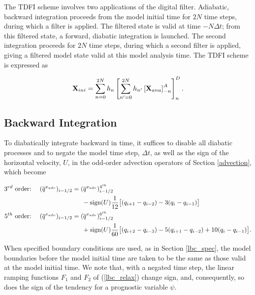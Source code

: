The TDFI scheme involves two applications of the digital filter. Adiabatic, 
backward integration proceeds from the model initial time for $2N$ time steps, 
during which a filter is applied. The filtered state is valid at time $-N \Delta t$; 
from this filtered state, a forward, diabatic integration is launched. The 
second integration proceeds for $2N$ time steps, during which a second filter 
is applied, giving a filtered model state valid at this model analysis time. 
The TDFI scheme is expressed as

\begin{equation}
{\bf X}_{ini} = \sum_{n=0}^{2N} h_n \left[    \sum_{n'=0}^{2N} h_{n'} \left[ {\bf X}_{ana} \right]_{-n}^A \right]_n^D.
\end{equation}

\subsection{Backward Integration}

To diabatically integrate backward in time, it suffices to disable all 
diabatic processes and to negate the model time step, $\Delta t$, as well as 
the sign of the horizontal velocity, $U$, in the odd-order advection 
operators of Section \ref{advection}, which become

\begin{align}
\hbox{3}^{rd} \hbox{ order:} ~~~~ & 
(\overline{q}^{x_{adv}})_{i-1/2} = 
(\overline{q}^{x_{adv}})_{i-1/2}^{4^{th}} 
\notag
\\
&~~~~~~~~~~~~~~~~~~~~
- \hbox{sign}(U){1 \over 12} \bigl[
(q_{i+1}-q_{i-2}) - 3(q_i - q_{i-1}) \bigr]
\notag
\\
\hbox{5}^{th} \hbox{ order:} ~~~~ & 
(\overline{q}^{x_{adv}})_{i-1/2} = 
(\overline{q}^{x_{adv}})_{i-1/2}^{6^{th}} 
\notag
\\
&~~~~~~~~~~~~~~~~~~~~
+ \hbox{sign}(U){1 \over 60} \bigl[
(q_{i+2}-q_{i-3}) - 5(q_{i+1} - q_{i-2}) 
+ 10(q_i - q_{i-1})
\bigr].
\notag
\end{align}

When specified boundary conditions are used, as in Section \ref{lbc_spec}, 
the model boundaries before the model initial time are taken to be the same 
as those valid at the model initial time. We note that, with a negated time 
step, the linear ramping functions $F_1$ and $F_2$ of (\ref{lbc_relax}) 
change sign, and, consequently, so does the sign of the tendency for a 
prognostic variable $\psi$.
